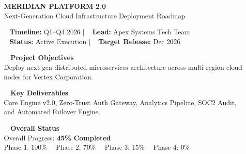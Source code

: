 \documentclass[10pt,landscape]{article}
\begin{document}
\begin{tcolorbox}[colback=NavyDark,colframe=NavyDark,arc=4pt,boxrule=0pt,top=6pt,bottom=6pt,left=10pt,right=10pt]
  \color{white}
  \begin{minipage}[c]{0.58\textwidth}
    {\Large \bfseries \color{white} MERIDIAN PLATFORM 2.0} \\[2pt]
    {\small \color{Accent!40} Next-Generation Cloud Infrastructure Deployment Roadmap}
  \end{minipage}%
  \hfill
  \begin{minipage}[c]{0.40\textwidth}
    \raggedleft \scriptsize \color{white!85}
    \faCalendar~ \textbf{Timeline:} Q1--Q4 2026 \quad | \quad \faUser~ \textbf{Lead:} Apex Systems Tech Team \\
    \faTag~ \textbf{Status:} Active Execution \quad | \quad \faCheckCircle~ \textbf{Target Release:} Dec 2026
  \end{minipage}
\end{tcolorbox}

\vspace{-4pt}

\begin{minipage}[t]{0.32\textwidth}
  \begin{tcolorbox}[colback=LightBg,colframe=BorderColor,arc=3pt,boxrule=0.5pt,top=4pt,bottom=4pt,left=6pt,right=6pt]
    {\small \bfseries \color{Primary} \faInfoCircle~ Project Objectives} \\[2pt]
    \scriptsize \color{Slate}
    Deploy next-gen distributed microservices architecture across multi-region cloud nodes for Vertex Corporation.
  \end{tcolorbox}
\end{minipage}%
\hfill
\begin{minipage}[t]{0.32\textwidth}
  \begin{tcolorbox}[colback=LightBg,colframe=BorderColor,arc=3pt,boxrule=0.5pt,top=4pt,bottom=4pt,left=6pt,right=6pt]
    {\small \bfseries \color{Primary} \faTasks~ Key Deliverables} \\[2pt]
    \scriptsize \color{Slate}
    Core Engine v2.0, Zero-Trust Auth Gateway, Analytics Pipeline, SOC2 Audit, and Automated Failover Engine.
  \end{tcolorbox}
\end{minipage}%
\hfill
\begin{minipage}[t]{0.32\textwidth}
  \begin{tcolorbox}[colback=LightBg,colframe=BorderColor,arc=3pt,boxrule=0.5pt,top=4pt,bottom=4pt,left=6pt,right=6pt]
    {\small \bfseries \color{Primary} \faChartPie~ Overall Status} \\[2pt]
    \scriptsize \color{Slate}
    Overall Progress: \textbf{45\% Completed} \\
    Phase 1: 100\% \ \vline \ Phase 2: 70\% \ \vline \ Phase 3: 15\% \ \vline \ Phase 4: 0\%
  \end{tcolorbox}
\end{minipage}
\end{document}
